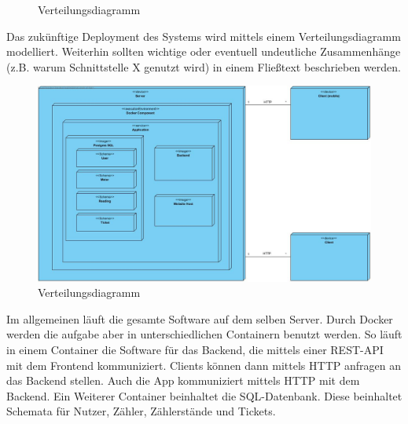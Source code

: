 \begin{figure}[h]
	\centering
	\caption{Verteilungsdiagramm}
	\label{fig:verteilungsdiagramm}
\end{figure}

\begin{tcolorbox}
	Das zukünftige Deployment des Systems wird mittels einem Verteilungsdiagramm modelliert.
	Weiterhin sollten wichtige oder eventuell undeutliche Zusammenhänge (z.B. warum Schnittstelle X genutzt wird) in einem Fließtext beschrieben werden.
\end{tcolorbox}

\begin{figure}[H]
	\centering
	\caption{Verteilungsdiagramm}
	\includegraphics[width=16cm]{img/Diagrams/DeploymentDiagram}
\end{figure}
Im allgemeinen läuft die gesamte Software auf dem selben Server. Durch Docker werden die aufgabe aber in unterschiedlichen Containern benutzt werden.
So läuft in einem Container die Software für das Backend, die mittels einer REST-API mit dem Frontend kommuniziert. Clients können dann mittels HTTP anfragen an
das Backend stellen. Auch die App kommuniziert mittels HTTP mit dem Backend.
Ein Weiterer Container beinhaltet die SQL-Datenbank. Diese beinhaltet Schemata für Nutzer, Zähler, Zählerstände und Tickets.